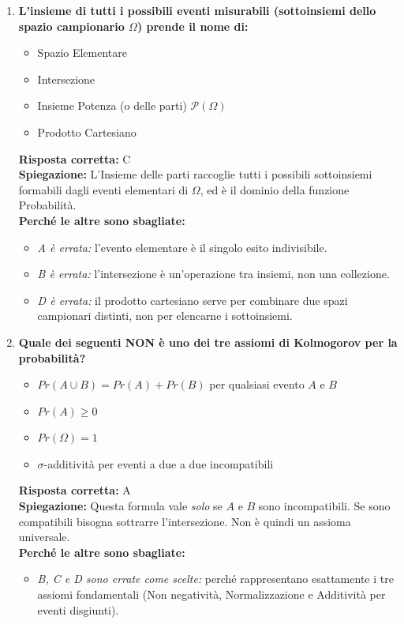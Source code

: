 \documentclass[12pt, a4paper]{article}
\begin{document}
\begin{enumerate}[label=\textbf{\arabic*.}]
    \item \textbf{L'insieme di tutti i possibili eventi misurabili (sottoinsiemi dello spazio campionario $\Omega$) prende il nome di:}
    \begin{itemize}
        \item[A)] Spazio Elementare
        \item[B)] Intersezione
        \item[C)] Insieme Potenza (o delle parti) $\mathcal{P}(\Omega)$
        \item[D)] Prodotto Cartesiano
    \end{itemize}
    \textbf{Risposta corretta:} C \\
    \textbf{Spiegazione:} L'Insieme delle parti raccoglie tutti i possibili sottoinsiemi formabili dagli eventi elementari di $\Omega$, ed è il dominio della funzione Probabilità. \\
    \textbf{Perché le altre sono sbagliate:}
    \begin{itemize}
        \item \textit{A è errata:} l'evento elementare è il singolo esito indivisibile.
        \item \textit{B è errata:} l'intersezione è un'operazione tra insiemi, non una collezione.
        \item \textit{D è errata:} il prodotto cartesiano serve per combinare due spazi campionari distinti, non per elencarne i sottoinsiemi.
    \end{itemize}

    \item \textbf{Quale dei seguenti NON è uno dei tre assiomi di Kolmogorov per la probabilità?}
    \begin{itemize}
        \item[A)] $Pr(A \cup B) = Pr(A) + Pr(B)$ per qualsiasi evento $A$ e $B$
        \item[B)] $Pr(A) \ge 0$
        \item[C)] $Pr(\Omega) = 1$
        \item[D)] $\sigma$-additività per eventi a due a due incompatibili
    \end{itemize}
    \textbf{Risposta corretta:} A \\
    \textbf{Spiegazione:} Questa formula vale \textit{solo} se $A$ e $B$ sono incompatibili. Se sono compatibili bisogna sottrarre l'intersezione. Non è quindi un assioma universale. \\
    \textbf{Perché le altre sono sbagliate:}
    \begin{itemize}
        \item \textit{B, C e D sono errate come scelte:} perché rappresentano esattamente i tre assiomi fondamentali (Non negatività, Normalizzazione e Additività per eventi disgiunti).
    \end{itemize}


\end{enumerate}
\end{document}
